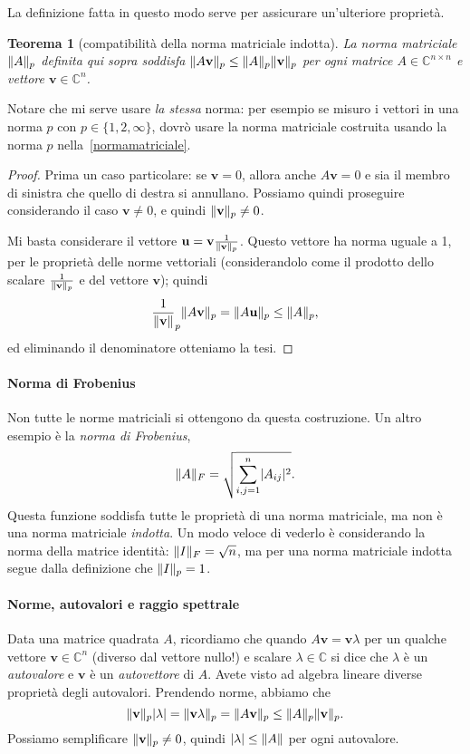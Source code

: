\documentclass[a4paper]{report}
\DeclarePairedDelimiter{\abs}{\lvert}{\rvert}
\DeclarePairedDelimiter{\norm}{\lVert}{\rVert}
\newtheorem{theorem}{Teorema}[chapter]
\theoremstyle{definiton}
\theoremstyle{remark}
\begin{document}
La definizione fatta in questo modo serve per assicurare un'ulteriore proprietà.
\begin{theorem}[compatibilità della norma matriciale indotta] \label{thm:compatibilita}
La norma matriciale $\norm{A}_p$ definita qui sopra soddisfa $\norm{A\mathbf{v}}_p \leq \norm{A}_p\norm{\mathbf{v}}_p$ per ogni matrice $A\in\mathbb{C}^{n\times n}$ e vettore $\mathbf{v}\in\mathbb{C}^n$.
\end{theorem}
Notare che mi serve usare \emph{la stessa} norma: per esempio se misuro i vettori in una norma $p$ con $p\in\{1,2,\infty\}$, dovrò usare la norma matriciale costruita usando la norma $p$ nella~\eqref{normamatriciale}.
\begin{proof}
Prima un caso particolare: se $\mathbf{v}=0$, allora anche $A\mathbf{v}=0$ e sia il membro di sinistra che quello di destra si annullano. Possiamo quindi proseguire considerando il caso $\mathbf{v}\neq 0$, e quindi $\norm{\mathbf{v}}_p \neq 0$.

Mi basta considerare il vettore $\mathbf{u} = \mathbf{v} \frac{1}{\norm{\mathbf{v}}_p}$. Questo vettore ha norma uguale a 1, per le proprietà delle norme vettoriali (considerandolo come il prodotto dello scalare $\frac{1}{\norm{\mathbf{v}}_p}$ e del vettore $\mathbf{v}$); quindi
\[
\frac{1}{\norm{\mathbf{v}}}_p \norm{A\mathbf{v}}_p  = \norm{A\mathbf{u}}_p \leq \norm{A}_p,
\]
ed eliminando il denominatore otteniamo la tesi.
\end{proof}

\paragraph{Norma di Frobenius}

Non tutte le norme matriciali si ottengono da questa costruzione. Un altro esempio è la \emph{norma di Frobenius},
\[
\norm{A}_F = \sqrt{\sum_{i,j=1}^n \abs{A_{ij}}^2}.
\]
Questa funzione soddisfa tutte le proprietà di una norma matriciale, ma non è una norma matriciale \emph{indotta}. Un modo veloce di vederlo è considerando la norma della matrice identità: $\norm{I}_F = \sqrt{n}$, ma per una norma matriciale indotta segue dalla definizione che $\norm{I}_p = 1$.

\paragraph{Norme, autovalori e raggio spettrale}

Data una matrice quadrata $A$, ricordiamo che quando $A\mathbf{v} = \mathbf{v}\lambda$ per un qualche vettore $\mathbf{v}\in\mathbb{C}^n$ (diverso dal vettore nullo!) e scalare $\lambda \in \mathbb{C}$ si dice che $\lambda$ è un \emph{autovalore} e $\mathbf{v}$ è un \emph{autovettore} di $A$. Avete visto ad algebra lineare diverse proprietà degli autovalori. Prendendo norme, abbiamo che
\[
\norm{\mathbf{v}}_p \abs{\lambda} = \norm{\mathbf{v}\lambda}_p = \norm{A\mathbf{v}}_p \leq \norm{A}_p \norm{\mathbf{v}}_p.
\]
Possiamo semplificare $\norm{\mathbf{v}}_p \neq 0$, quindi $\abs{\lambda} \leq \norm{A}$ per ogni autovalore.
\end{document}
